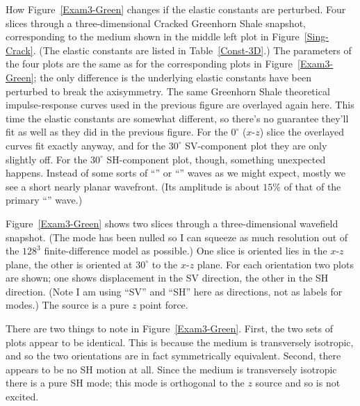 {How Figure~\protect\ref{Exam3-Green} changes
if the elastic constants are perturbed.}
{
\small
Four slices through a three-dimensional Cracked Greenhorn Shale
snapshot, corresponding to the medium shown in the middle left plot
in Figure~\protect\ref{Sing-Crack}. (The elastic constants are listed
in Table~\ref{Const-3D}.)
The parameters of the four plots are the same as for the corresponding
plots in Figure~\protect\ref{Exam3-Green}; the only difference is
the underlying elastic constants have been perturbed to break the
axisymmetry.
The same Greenhorn Shale theoretical impulse-response curves
used in the previous figure are overlayed again here. This time
the elastic constants are somewhat different, so there's no guarantee
they'll fit as well as they did in the previous figure.
For the $0^\circ$ ($x$-$z$) slice the overlayed curves fit exactly anyway,
and for the $30^\circ$ SV-component plot they are only slightly off.
For the $30^\circ$ SH-component plot, though, something unexpected happens.
Instead of some sorts of ``{\qSV}'' or ``{\qSH}'' waves as we might expect,
mostly we see a short nearly planar wavefront.
(Its amplitude is about $15\%$ of that of the primary ``{\qSV}'' wave.)
}

Figure~\ref{Exam3-Green} shows two slices through a three-dimensional
wavefield snapshot. (The {\qP} mode has been nulled so I can squeeze
as much resolution out of the $128^3$ finite-difference model as possible.)
One slice is oriented lies in the $x$-$z$ plane, the other is
oriented at $30^\circ$ to the $x$-$z$ plane.
For each orientation two plots are shown;
one shows displacement in the SV direction,
the other in the SH direction.
(Note I am using ``SV'' and ``SH'' here as directions,
not as labels for modes.)
The source is a pure $z$ point force.

There are two things to note in Figure~\ref{Exam3-Green}.
First, the two sets of plots appear to be identical.
This is because the medium is
transversely isotropic, and so the two orientations
are in fact symmetrically equivalent.
Second, there appears to be no SH motion at all.
Since the medium is transversely isotropic there is a pure
SH mode; this mode is orthogonal to the $z$ source and so is not excited.

